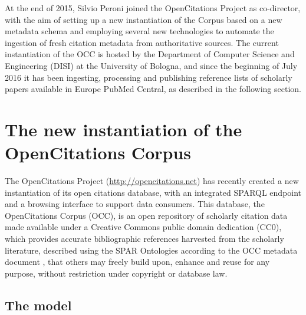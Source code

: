 \documentclass[runningheads,a4paper]{llncs}
\begin{document}
At the end of 2015, Silvio Peroni joined the OpenCitations Project as co-director, with the aim of setting up a new instantiation of the Corpus based on a new metadata schema and employing several new technologies to automate the ingestion of fresh citation metadata from authoritative sources. The current instantiation of the OCC is hosted by the Department of Computer Science and Engineering (DISI) at the University of Bologna, and since the beginning of July 2016 it has been ingesting, processing and publishing reference lists of scholarly papers available in Europe PubMed Central, as described in the following section.

\section{The new instantiation of the OpenCitations Corpus}\label{__RefHeading__151_1852566440}

The OpenCitations Project (\url{http://opencitations.net}) has recently created a new instantiation of its open citations database, with an integrated SPARQL endpoint and a browsing interface to support data consumers. This database, the OpenCitations Corpus (OCC), is an open repository of scholarly citation data made available under a Creative Commons public domain dedication (CC0), which provides accurate bibliographic references harvested from the scholarly literature, described using the SPAR Ontologies  \cite{__RefNumPara__17_1852566440} according to the OCC metadata document  \cite{__RefNumPara__19_1852566440}, that others may freely build upon, enhance and reuse for any purpose, without restriction under copyright or database law.

\subsection{The model}\label{__RefHeading__5535_1890349413}
\end{document}
